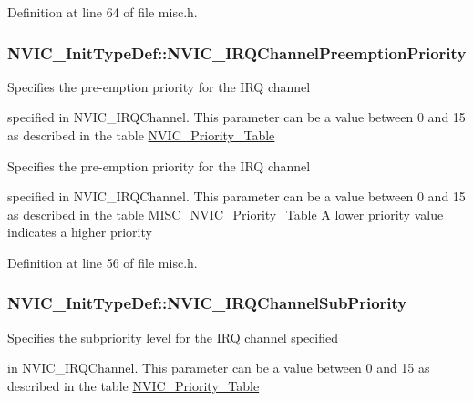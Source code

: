 Definition at line 64 of file misc.\-h.

\hypertarget{struct_n_v_i_c___init_type_def_aa3fe262c30188404a6e31f922c5ae513}{
\subsubsection[{N\-V\-I\-C\-\_\-\-I\-R\-Q\-Channel\-Preemption\-Priority}]{ N\-V\-I\-C\-\_\-\-Init\-Type\-Def\-::\-N\-V\-I\-C\-\_\-\-I\-R\-Q\-Channel\-Preemption\-Priority}}\label{struct_n_v_i_c___init_type_def_aa3fe262c30188404a6e31f922c5ae513}
\begin{DoxyVerb}  Specifies the pre-emption priority for the IRQ channel
\end{DoxyVerb}
 specified in N\-V\-I\-C\-\_\-\-I\-R\-Q\-Channel. This parameter can be a value between 0 and 15 as described in the table \hyperlink{group___n_v_i_c___priority___table}{N\-V\-I\-C\-\_\-\-Priority\-\_\-\-Table}

\begin{DoxyVerb}  Specifies the pre-emption priority for the IRQ channel
\end{DoxyVerb}
 specified in N\-V\-I\-C\-\_\-\-I\-R\-Q\-Channel. This parameter can be a value between 0 and 15 as described in the table M\-I\-S\-C\-\_\-\-N\-V\-I\-C\-\_\-\-Priority\-\_\-\-Table A lower priority value indicates a higher priority 

Definition at line 56 of file misc.\-h.

\hypertarget{struct_n_v_i_c___init_type_def_aecc22a002244e3f1f9448dbe46c1db4b}{
\subsubsection[{N\-V\-I\-C\-\_\-\-I\-R\-Q\-Channel\-Sub\-Priority}]{ N\-V\-I\-C\-\_\-\-Init\-Type\-Def\-::\-N\-V\-I\-C\-\_\-\-I\-R\-Q\-Channel\-Sub\-Priority}}\label{struct_n_v_i_c___init_type_def_aecc22a002244e3f1f9448dbe46c1db4b}
\begin{DoxyVerb}         Specifies the subpriority level for the IRQ channel specified
\end{DoxyVerb}
 in N\-V\-I\-C\-\_\-\-I\-R\-Q\-Channel. This parameter can be a value between 0 and 15 as described in the table \hyperlink{group___n_v_i_c___priority___table}{N\-V\-I\-C\-\_\-\-Priority\-\_\-\-Table}


